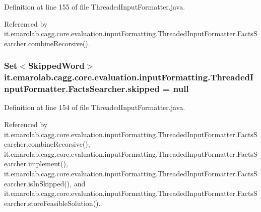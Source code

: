 Definition at line 155 of file Threaded\-Input\-Formatter.\-java.



Referenced by it.\-emarolab.\-cagg.\-core.\-evaluation.\-input\-Formatting.\-Threaded\-Input\-Formatter.\-Facts\-Searcher.\-combine\-Recorsive().

\hypertarget{classit_1_1emarolab_1_1cagg_1_1core_1_1evaluation_1_1inputFormatting_1_1ThreadedInputFormatter_1_1FactsSearcher_a887696fcd109fd3aabfe45a314677a97}{
\subsubsection[{skipped}]{\setlength{\rightskip}{0pt plus 5cm}Set$<${\bf Skipped\-Word}$>$ it.\-emarolab.\-cagg.\-core.\-evaluation.\-input\-Formatting.\-Threaded\-Input\-Formatter.\-Facts\-Searcher.\-skipped = null\hspace{0.3cm}{\ttfamily [private]}}}\label{classit_1_1emarolab_1_1cagg_1_1core_1_1evaluation_1_1inputFormatting_1_1ThreadedInputFormatter_1_1FactsSearcher_a887696fcd109fd3aabfe45a314677a97}


Definition at line 154 of file Threaded\-Input\-Formatter.\-java.



Referenced by it.\-emarolab.\-cagg.\-core.\-evaluation.\-input\-Formatting.\-Threaded\-Input\-Formatter.\-Facts\-Searcher.\-combine\-Recorsive(), it.\-emarolab.\-cagg.\-core.\-evaluation.\-input\-Formatting.\-Threaded\-Input\-Formatter.\-Facts\-Searcher.\-implement(), it.\-emarolab.\-cagg.\-core.\-evaluation.\-input\-Formatting.\-Threaded\-Input\-Formatter.\-Facts\-Searcher.\-is\-In\-Skipped(), and it.\-emarolab.\-cagg.\-core.\-evaluation.\-input\-Formatting.\-Threaded\-Input\-Formatter.\-Facts\-Searcher.\-store\-Feasible\-Solution().

